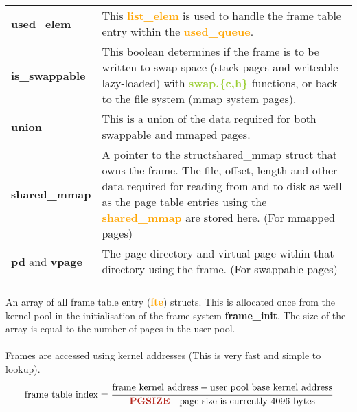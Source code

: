 \documentclass{report}
\newcommand{\fun}[1]{\textcolor{Emerald}{\textbf{#1}}}
\newcommand{\file}[1]{\textcolor{YellowGreen}{\textbf{#1}}}
\newcommand{\struct}[1]{\textcolor{orange}{\textbf{#1}}}
\newcommand{\var}[1]{\textcolor{RoyalPurple}{\textbf{#1}}}
\newcommand{\const}[1]{\textcolor{BrickRed}{\textbf{#1}}}
\newcommand{\pintoscode}[4]{}
\newcommand{\pintosfile}[3]{\pintoscode{#1}{#2}{\file{#3}}{#3}}
\begin{document}
				\pintosfile{11}{22}{frame.c}
				\begin{center}
					\begin{tabular}{l p{10cm}}
						\vspace*{2mm}
						\var{used\_elem} & This \struct{list\_elem} is used to handle the 
						frame table entry within the \struct{used\_queue}. \\ \vspace*{2mm}

						\var{is\_swappable}  & This boolean determines if the frame is to be written to 
						swap space (stack pages and writeable lazy-loaded) with \file{swap.\{c,h\}} 
						functions, or back to the file system (mmap system pages). \\ \vspace*{2mm}

						\const{union}  & This is a union of the data required for both swappable 
						and mmaped pages.  \\ \vspace*{2mm}

						\var{shared\_mmap}  & A pointer to the 
						struct{shared\_mmap} struct that owns the frame. The file, offset, 
						length and other data required for reading from and to disk as well 
						as the page table entries using the \struct{shared\_mmap} are stored
						here. (For mmapped pages)
						\\ \vspace*{2mm}

						\var{pd} and \var{vpage}  & The page directory and virtual page 
						within that directory using the frame. (For swappable pages) 
						\\ \vspace*{2mm}
					\end{tabular}
				\end{center}
				
				\pintosfile{38}{38}{frame.c}
				An array of all frame table entry (\struct{fte}) structs. 
				This is allocated once from the kernel pool in the initialisation of the 
				frame system \fun{frame\_init}. The size of the array is equal to the number
				of pages in the user pool.
				\\
				\\ Frames are accessed using kernel addresses (This is very fast and 
				simple to lookup).
				\[\text{frame table index} = \cfrac{\text{frame kernel address} - 
				\text{user pool base kernel address}}{\text{\const{PGSIZE} - 
				page size is currently 4096 bytes}}\]
				
\end{document}
